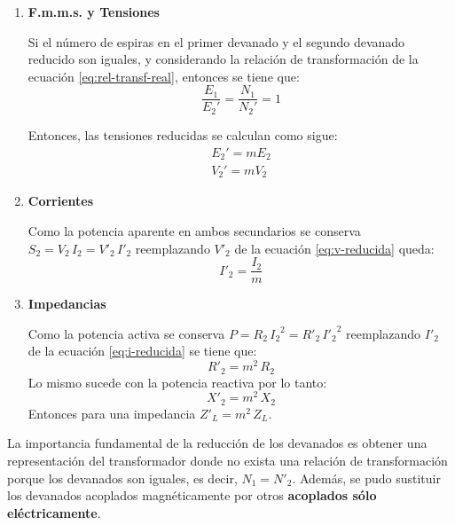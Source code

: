 \begin{enumerate}[label=\textbf{\alph*)}]
	\item \textbf{F.m.m.s. y Tensiones}
	
	Si el número de espiras en el primer devanado y el segundo devanado reducido son iguales, y considerando la relación de transformación de la ecuación \ref{eq:rel-transf-real}, entonces se tiene que:
	\begin{equation*}
		\dfrac{E_1}{E_2'} = \dfrac{N_1}{N_2'} = 1
	\end{equation*}

	Entonces, las tensiones reducidas se calculan como sigue:
	\begin{equation}
			\begin{split}
				E_2' = m E_2 \\
				V_2' = m V_2
			\end{split}
		\label{eq:v-reducida}
	\end{equation}
	
	\item \textbf{Corrientes}
	
	
	Como la potencia aparente en ambos secundarios se conserva $S_{2}=V_{2}\, I_{2}=V'_{2}\, I'_{2}$ reemplazando $V'_{2}$ de la ecuación \ref{eq:v-reducida} queda:
	\begin{equation}
		I'_{2}=\dfrac{I_{2}}{m}
		\label{eq:i-reducida}
	\end{equation}


	\item \textbf{Impedancias}
	
	
	Como la potencia activa se conserva $P = R_{2}\, {I_{2}}^{2} = R'_{2} \, {I'_{2}}^{2}$ reemplazando $I'_{2}$ de la ecuación \ref{eq:i-reducida} se tiene que:
	\begin{equation}
		R'_{2}=m^{2}\, R_{2}
	\end{equation}
	Lo mismo sucede con la potencia reactiva por lo tanto:
	\begin{equation}
		X'_{2}=m^{2}\, X_{2}
	\end{equation}
	Entonces para una impedancia $Z'_{L}=m^{2}\, Z_{L}$.
\end{enumerate}

La importancia fundamental de la reducción de los devanados es obtener una representación del transformador donde no exista una relación de transformación porque los devanados son iguales, es decir, $N_{1}=N'_{2}$. Además, se pudo sustituir los devanados acoplados magnéticamente por otros \textbf{acoplados sólo eléctricamente}.\\


